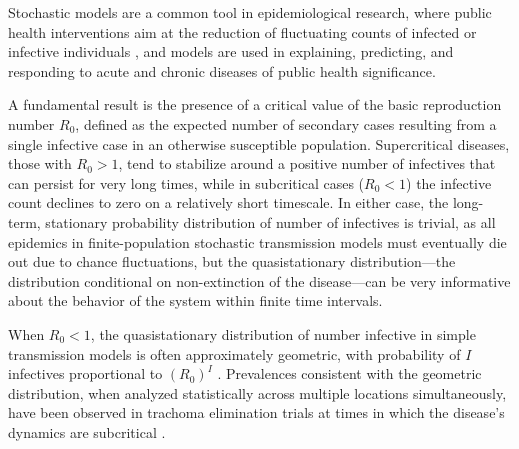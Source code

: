 \documentclass[review]{elsarticle}
\begin{document}
Stochastic models are a common tool in epidemiological
research, where public health
interventions aim at the reduction of fluctuating counts of
infected or infective individuals \cite{bailey1975}, and
models are used in explaining, predicting, and responding to
acute and chronic diseases of public health significance.

A fundamental result is the presence of a critical value of the basic
reproduction number $R_0$, defined as the expected number of
secondary cases resulting from a single infective case in an
otherwise susceptible population.
Supercritical diseases, those with $R_0>1$,
tend to stabilize around a positive number of infectives
that can persist for very long times,
while in subcritical cases ($R_0<1$) the infective count
declines to zero on a relatively short timescale.
In either case,
the long-term, stationary probability distribution of number of infectives
is trivial, as all epidemics
in finite-population stochastic transmission models 
must eventually die out due to chance fluctuations,
but the quasistationary distribution---the distribution
conditional on non-extinction of the disease---can be very 
informative about the behavior of the system within finite time
intervals.

When $R_0<1$,
the quasistationary distribution of number infective
in simple transmission models
is often approximately geometric,
with probability of $I$ infectives proportional to $(R_0)^I$
\cite{nasell_quasi-stationary_1996,lambert2008population}.
Prevalences consistent with the geometric distribution,
when analyzed statistically across multiple locations simultaneously,
have been observed in trachoma elimination trials
at times in which the disease's dynamics are subcritical
\cite{lietman_epidemiological_2011,lietman-gebre-abdou2015,rahman_distribution_2015}.
\end{document}
